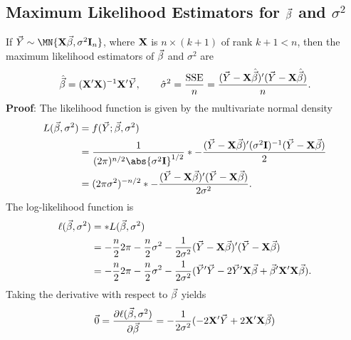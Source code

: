 \subsection*{Maximum Likelihood Estimators for $ \vec{\beta} $ and $ \sigma^2 $}
\begin{Theorem}{}{}
    If $ \Vector{Y}\sim \MN{\Matrix{X}\Vector{\beta},\sigma^2 \Matrix{I}_n} $, where $ \mathbf{X} $
    is $ n\times(k+1) $ of rank $ k+1<n $, then the maximum likelihood estimators of $ \vec{\beta} $ and $ \sigma^2 $ are
    \[ \hat{\vec{\beta}}=(\mathbf{X}'\mathbf{X})^{-1}\mathbf{X}'\vec{Y},\qquad \hat{\sigma}^2=\frac{\text{SSE}}{n}=\frac{(\vec{Y}-\mathbf{X}\hat{\vec{\beta}})'(\vec{Y}-\mathbf{X}\hat{\vec{\beta}})}{n}. \]
    \tcblower{}
    \textbf{Proof}: The likelihood function is given by the multivariate normal density
    \begin{align*}
        L(\Vector{\beta},\sigma^2)
         & =f(\Vector{Y};\Vector{\beta},\sigma^2)                                                                                                                                        \\
         & =\frac{1}{(2\pi)^{n/2}\abs{\sigma^2 \Matrix{I}}^{1/2}}\exp*{-\frac{(\Vector{Y}-\Matrix{X}\Vector{\beta})'(\sigma^2 \Matrix{I})^{-1}(\Vector{Y}-\Matrix{X}\Vector{\beta})}{2}} \\
         & =(2\pi\sigma^2)^{-n/2}\exp*{-\frac{(\Vector{Y}-\Matrix{X}\Vector{\beta})'(\Vector{Y}-\Matrix{X}\Vector{\beta})}{2\sigma^2}}.
    \end{align*}
    The log-likelihood function is
    \begin{align*}
        \ell(\vec{\beta},\sigma^2)
         & =\relax*{L(\vec{\beta},\sigma^2)}                                                                                                                                                    \\
         & =-\frac{n}{2}\relax{2\pi}-\frac{n}{2}\relax{\sigma^2}-\frac{1}{2\sigma^2}(\vec{Y}-\mathbf{X}\vec{\beta})'(\vec{Y}-\mathbf{X}\vec{\beta})                                       \\
         & =-\frac{n}{2}\relax{2\pi}-\frac{n}{2}\relax{\sigma^2}-\frac{1}{2\sigma^2}(\vec{Y}'\vec{Y}-2 \vec{Y}'\mathbf{X}\vec{\beta}+\vec{\beta}'\mathbf{X}'\mathbf{X}\vec{\beta}).
    \end{align*}
    Taking the derivative with respect to $ \vec{\beta} $ yields
    \begin{align*}
        \Vector{0}                          & =\pdv{\ell(\Vector{\beta},\sigma^2)}{\Vector{\beta}}=-\frac{1}{2\sigma^2}(-2 \Matrix{X}'\Vector{Y}+2 \Matrix{X}'\Matrix{X}\Vector{\beta}) \\

\end{align*}
\end{Theorem}
